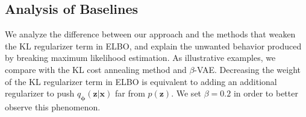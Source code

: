 \documentclass{article} \usepackage{iclr2019_conference,times}
\def\rvx{{\mathbf{x}}}
\def\rvz{{\mathbf{z}}}
\def\vphi{{\bm{\phi}}}
\newcommand{\qzx}{q_{\vphi}(\rvz|\rvx)}
\newcommand{\pz}{p(\rvz)}
\begin{document}
\begin{table}[!t]
\caption{Comparison of total training time, in terms of relative speed and absolute hours.}
\label{timing-table}
\centering
\vspace{-3mm}
\end{table}

\subsection{Analysis of Baselines}
\label{sec:mi}
We analyze the difference between our approach and the methods that weaken the KL regularizer term in ELBO, and explain the unwanted behavior produced by breaking maximum likelihood estimation. As illustrative examples, we compare with the KL cost annealing method and $\beta$-VAE. Decreasing the weight of the KL regularizer term in ELBO is equivalent to adding an additional regularizer to push $\qzx$ far from $\pz$. We set $\beta=0.2$ in order to better observe this phenomenon.
\end{document}
